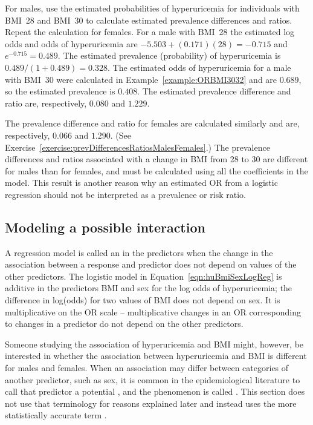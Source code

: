 \begin{examplewrap}
\begin{nexample}{For males, use the estimated probabilities of hyperuricemia for individuals with BMI~28 and BMI~30 to calculate estimated prevalence differences and ratios.  Repeat the calculation for females. }
For a male with BMI~28 the estimated log odds and odds of hyperuricemia are $-5.503 + (0.171)(28) = -0.715$ and  $e^{-0.715} = 0.489$.  The estimated prevalence (probability) of hyperuricemia is $0.489/(1 + 0.489) = 0.328$.  The estimated odds of hyperuricemia for a male with BMI~30 were calculated in Example~\ref{example:ORBMI3032} and are $0.689$, so the estimated prevalence is $0.408$.  The estimated prevalence difference and ratio are, respectively, $0.080$ and $1.229$.

The prevalence difference and ratio for females are calculated similarly and are, respectively, $0.066$ and $1.290$. (See Exercise~\ref{exercise:prevDifferencesRatiosMalesFemales}.)  The prevalence differences and ratios associated with a change in BMI from 28 to 30 are different for males than for females, and must be calculated using all the coefficients in the model.  This result is another reason why an estimated OR from a logistic regression should not be interpreted as a prevalence or risk ratio.

\label{example:probsDependOnOtherVars}
\end{nexample}
\end{examplewrap}


\subsection{Modeling a possible interaction}
\label{section:interactionLogisticRegression}

A regression model is called an  in the predictors when the change in the association between a response and predictor does not depend on values of the other predictors. The logistic model in Equation~\ref{eqn:huBmiSexLogReg} is additive in the predictors BMI and sex for the log odds of hyperuricemia; the difference in log(odds) for two values of BMI does not depend on sex. It is multiplicative on the OR scale -- multiplicative changes in an OR corresponding to changes in a predictor do not depend on the other predictors.

Someone studying the association of hyperuricemia and BMI might, however, be interested in whether the association between hyperuricemia and BMI is different for males and females. When an association may differ between categories of another predictor, such as sex, it is common in the epidemiological literature to call that predictor a potential , and the phenomenon is called .  This section does not use that terminology for reasons explained later and instead uses the more statistically accurate term .

